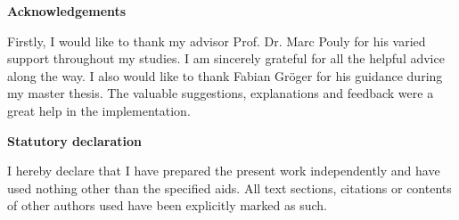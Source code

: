 
\vspace*{2cm}

\noindent\textbf{Acknowledgements}\par\noindent
Firstly, I would like to thank my advisor Prof. Dr. Marc Pouly for his varied support throughout my studies.
I am sincerely grateful for all the helpful advice along the way.
I also would like to thank Fabian Gröger for his guidance during my master thesis.
The valuable suggestions, explanations and feedback were a great help in the implementation.

\vspace*{2cm}

\noindent\textbf{Statutory declaration}\par\noindent
I hereby declare that I have prepared the present work independently and have used nothing other than the specified aids. All text sections, citations or contents of other authors used have been explicitly marked as such.\par 

\begin{center}
\end{center}
 
\newpage
 
